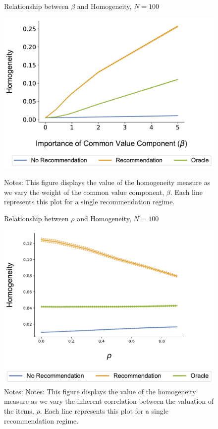\documentclass[format=acmsmall, review=true]{acmart}
\begin{document}
\begin{figure}[ht]
\caption{Relationship between $\beta$ and Homogeneity, $N = 100$}
\includegraphics[width=.45\linewidth]{figures/beta_homogeneity_N_200_T_20}\label{fig:beta_homo}
\caption*{\scriptsize Notes: This figure displays the value of the homogeneity measure as we vary the weight of the common value component, $\beta$. Each line represents this plot for a single recommendation regime.}
\end{figure}
\begin{figure}[ht]
\caption{Relationship between $\rho$ and Homogeneity, $N = 100$}
\includegraphics[width=.45\linewidth]{figures/rho_homogeneity_N_100_T_20}
\caption*{\scriptsize Notes: Notes: This figure displays the value of the homogeneity measure as we vary the inherent correlation between the valuation of the items, $\rho$. Each line represents this plot for a single recommendation regime.}\label{fig:cor_homo}
\end{figure}
\end{document}
